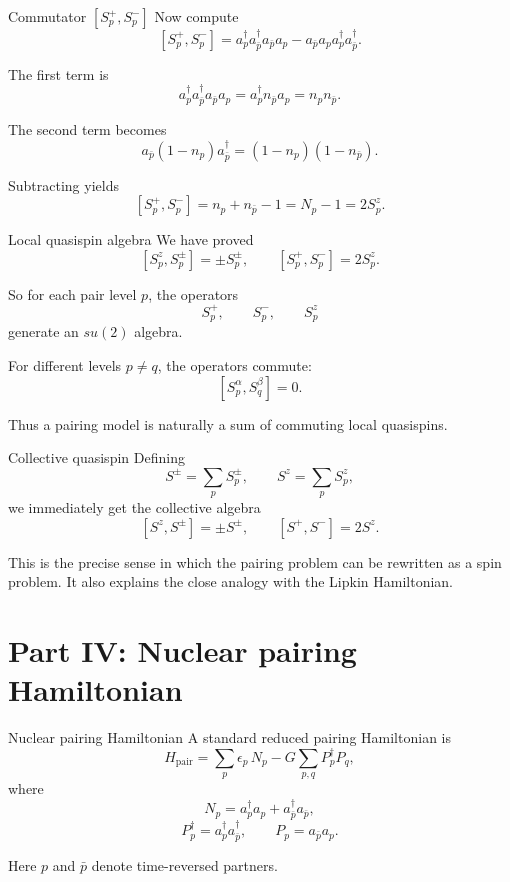 \documentclass[aspectratio=169]{beamer}
\begin{document}
\begin{frame}{Commutator \([S_p^+,S_p^-]\)}
Now compute
\[
[S_p^+,S_p^-]
=
a_p^\dagger a_{\bar p}^\dagger a_{\bar p} a_p
-
a_{\bar p} a_p a_p^\dagger a_{\bar p}^\dagger.
\]

The first term is
\[
a_p^\dagger a_{\bar p}^\dagger a_{\bar p} a_p
=
a_p^\dagger n_{\bar p} a_p
=
n_p n_{\bar p}.
\]

The second term becomes
\[
a_{\bar p}(1-n_p)a_{\bar p}^\dagger
=
(1-n_p)(1-n_{\bar p}).
\]

Subtracting yields
\[
[S_p^+,S_p^-]
=
n_p+n_{\bar p}-1
=
N_p-1
=
2S_p^z.
\]
\end{frame}

\begin{frame}{Local quasispin algebra}
We have proved
\[
[S_p^z,S_p^\pm] = \pm S_p^\pm,
\qquad
[S_p^+,S_p^-] = 2S_p^z.
\]

So for each pair level \(p\), the operators
\[
S_p^+,\qquad S_p^-,\qquad S_p^z
\]
generate an \(su(2)\) algebra.

For different levels \(p\neq q\), the operators commute:
\[
[S_p^\alpha,S_q^\beta]=0.
\]

Thus a pairing model is naturally a sum of commuting local quasispins.
\end{frame}

\begin{frame}{Collective quasispin}
Defining
\[
S^\pm = \sum_p S_p^\pm,
\qquad
S^z = \sum_p S_p^z,
\]
we immediately get the collective algebra
\[
[S^z,S^\pm]=\pm S^\pm,
\qquad
[S^+,S^-]=2S^z.
\]

This is the precise sense in which the pairing problem can be rewritten as a spin problem.
It also explains the close analogy with the Lipkin Hamiltonian.
\end{frame}

\section{Part IV: Nuclear pairing Hamiltonian}

\begin{frame}{Nuclear pairing Hamiltonian}
A standard reduced pairing Hamiltonian is
\[
H_{\mathrm{pair}}
=
\sum_{p} \epsilon_p \, N_p
-
G \sum_{p,q} P_p^\dagger P_q,
\]
where
\[
N_p = a_p^\dagger a_p + a_{\bar p}^\dagger a_{\bar p},
\]
\[
P_p^\dagger = a_p^\dagger a_{\bar p}^\dagger,
\qquad
P_p = a_{\bar p} a_p.
\]

Here \(p\) and \(\bar p\) denote time-reversed partners.
\end{frame}
\end{document}
